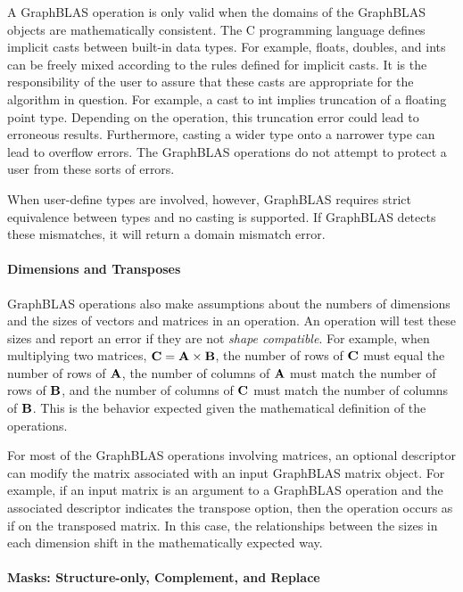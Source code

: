 A GraphBLAS operation is only valid when the domains of the GraphBLAS objects are
mathematically consistent.  The C programming language defines implicit casts 
between built-in data types.  For example, {\sf float}s, {\sf double}s, and {\sf int}s can be 
freely mixed according to the rules defined for implicit casts.  It is the 
responsibility of the user to assure that these casts are appropriate for the 
algorithm in question.  For example, a cast to {\sf int} implies truncation of a floating 
point type.  Depending on the operation, this truncation error could lead to
erroneous results.  Furthermore, casting a wider type onto a narrower type can lead 
to overflow errors.  The GraphBLAS operations do not attempt to protect a user from 
these sorts of errors.

When user-define types are involved, however, GraphBLAS requires strict equivalence
between types and no casting is supported.  If GraphBLAS detects these mismatches,
it will return a domain mismatch error.

\paragraph{Dimensions and Transposes}

GraphBLAS operations also make assumptions about the numbers of dimensions and 
the sizes of vectors and matrices in an operation.   An operation will test these 
sizes and report an error if they are not \emph{shape compatible}.  For example, when multiplying 
two matrices, ${\bf C} = {\bf A} \times {\bf B}$, the number of rows of 
${\bf C}$ must equal the number of rows of ${\bf A}$, the number of columns 
of ${\bf A}$ must match the number of rows of ${\bf B}$, and the number of 
columns of ${\bf C}$ must match the number of columns of ${\bf B}$.  This 
is the behavior expected given the mathematical definition of the operations.   

For most of the GraphBLAS operations involving matrices, an optional descriptor 
can modify the matrix associated with an input GraphBLAS matrix object.  For 
example, if an input matrix is an argument to a GraphBLAS operation and the 
associated descriptor indicates the transpose option, then the operation occurs 
as if on the transposed matrix.  In this case, the relationships between the 
sizes in each dimension shift in the mathematically expected way. 

\paragraph{Masks: Structure-only, Complement, and Replace}

